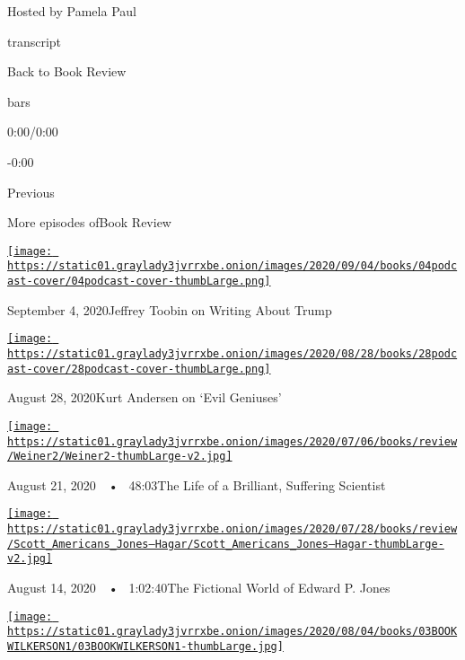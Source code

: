 Hosted by Pamela Paul

transcript

Back to Book Review

bars

0:00/0:00

-0:00

Previous

More episodes ofBook Review

\href{https://www.nytimes3xbfgragh.onion/2020/09/04/books/review/podcast-jeffrey-toobin-true-crimes-misdemeanors-trump-dayna-tortorici-elena-ferrante.html?action=click\&module=audio-series-bar\&region=header\&pgtype=Article}{\texttt{[image: https://static01.graylady3jvrrxbe.onion/images/2020/09/04/books/04podcast-cover/04podcast-cover-thumbLarge.png]}}

September 4, 2020Jeffrey Toobin on Writing About Trump

\href{https://www.nytimes3xbfgragh.onion/2020/08/28/books/review/podcast-evil-geniuses-kurt-andersen-fallout-hiroshima-lesley-m-m-blume.html?action=click\&module=audio-series-bar\&region=header\&pgtype=Article}{\texttt{[image: https://static01.graylady3jvrrxbe.onion/images/2020/08/28/books/28podcast-cover/28podcast-cover-thumbLarge.png]}}

August 28, 2020Kurt Andersen on `Evil Geniuses'

\href{https://www.nytimes3xbfgragh.onion/2020/08/21/books/review/podcast-Dominant-Character-Samanth-Subramanian-Book-of-Eels-Patrik-Svensson.html?action=click\&module=audio-series-bar\&region=header\&pgtype=Article}{\texttt{[image: https://static01.graylady3jvrrxbe.onion/images/2020/07/06/books/review/Weiner2/Weiner2-thumbLarge-v2.jpg]}}

August 21, 2020~~•~ 48:03The Life of a Brilliant, Suffering Scientist

\href{https://www.nytimes3xbfgragh.onion/2020/08/14/books/review/podcast-a-o-scott-edward-p-jones-eric-jay-dolin-furious-sky-hurricanes.html?action=click\&module=audio-series-bar\&region=header\&pgtype=Article}{\texttt{[image: https://static01.graylady3jvrrxbe.onion/images/2020/07/28/books/review/Scott\_Americans\_Jones--Hagar/Scott\_Americans\_Jones--Hagar-thumbLarge-v2.jpg]}}

August 14, 2020~~•~ 1:02:40The Fictional World of Edward P. Jones

\href{https://www.nytimes3xbfgragh.onion/2020/08/07/books/review/podcast-isabel-wilkerson-caste-david-hill-vapors.html?action=click\&module=audio-series-bar\&region=header\&pgtype=Article}{\texttt{[image: https://static01.graylady3jvrrxbe.onion/images/2020/08/04/books/03BOOKWILKERSON1/03BOOKWILKERSON1-thumbLarge.jpg]}}

